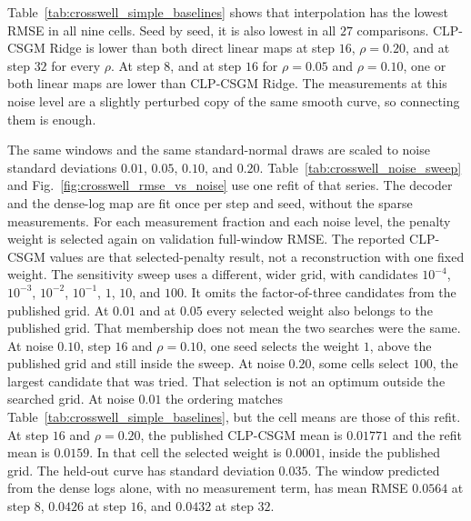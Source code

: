 Table~\ref{tab:crosswell_simple_baselines} shows that interpolation has the
lowest RMSE in all nine cells. Seed by seed, it is also lowest in all $27$
comparisons. CLP-CSGM Ridge is lower than both direct linear maps at step
$16$, $\rho=0.20$, and at step $32$ for every $\rho$. At step $8$, and at
step $16$ for $\rho=0.05$ and $\rho=0.10$, one or both linear maps are lower
than CLP-CSGM Ridge. The measurements at this noise level are a slightly
perturbed copy of the same smooth curve, so connecting them is enough.

The same windows and the same standard-normal draws are scaled to noise
standard deviations $0.01$, $0.05$, $0.10$, and $0.20$.
Table~\ref{tab:crosswell_noise_sweep} and
Fig.~\ref{fig:crosswell_rmse_vs_noise} use one refit of that series.
The decoder and the dense-log map are fit once per step and seed, without
the sparse measurements. For each measurement fraction and each noise
level, the penalty weight is selected again on validation full-window RMSE.
The reported CLP-CSGM values are that selected-penalty result, not a
reconstruction with one fixed weight. The sensitivity sweep uses a
different, wider grid, with candidates $10^{-4}$, $10^{-3}$, $10^{-2}$,
$10^{-1}$, $1$, $10$, and $100$. It omits the factor-of-three candidates
from the published grid. At $0.01$ and at $0.05$ every selected weight also
belongs to the published grid. That membership does not mean the two
searches were the same. At noise $0.10$, step $16$ and
$\rho=0.10$, one seed selects the weight $1$, above the published grid and still
inside the sweep. At noise $0.20$, some cells select
$100$, the largest candidate that was tried. That selection is not an
optimum outside the searched grid. At noise $0.01$ the ordering matches
Table~\ref{tab:crosswell_simple_baselines}, but the cell means are those of
this refit. At step $16$ and $\rho=0.20$, the published CLP-CSGM mean is
$0.01771$ and the refit mean is $0.0159$. In that cell the selected weight
is $0.0001$, inside the published grid. The held-out curve has standard
deviation $0.035$. The window predicted from the dense logs alone, with no
measurement term, has mean RMSE $0.0564$ at step $8$, $0.0426$ at step
$16$, and $0.0432$ at step $32$.

